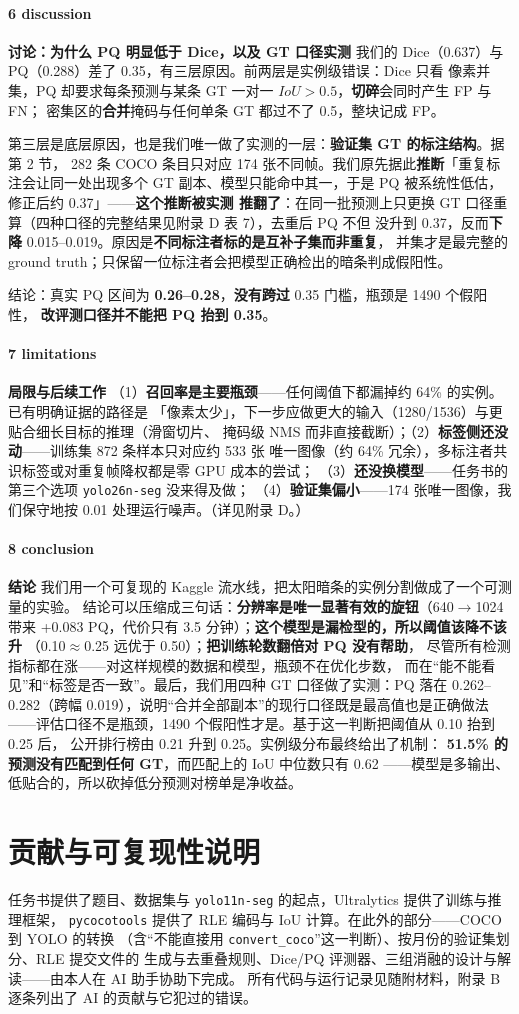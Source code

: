 \documentclass{article}
\begin{document}
\paragraph{6 discussion}
\textbf{讨论：为什么 PQ 明显低于 Dice，以及 GT 口径实测}
我们的 Dice（0.637）与 PQ（0.288）差了 0.35，有三层原因。前两层是实例级错误：Dice 只看
像素并集，PQ 却要求每条预测与某条 GT 一对一 $IoU>0.5$，\textbf{切碎}会同时产生 FP 与 FN；
密集区的\textbf{合并}掩码与任何单条 GT 都过不了 0.5，整块记成 FP。

第三层是底层原因，也是我们唯一做了实测的一层：\textbf{验证集 GT 的标注结构}。据第 2 节，
282 条 COCO 条目只对应 174 张不同帧。我们原先据此\textbf{推断}「重复标注会让同一处出现多个
GT 副本、模型只能命中其一，于是 PQ 被系统性低估，修正后约 0.37」——\textbf{这个推断被实测
推翻了}：在同一批预测上只更换 GT 口径重算（四种口径的完整结果见附录 D 表 7），去重后 PQ 不但
没升到 0.37，反而\textbf{下降} 0.015--0.019。原因是\textbf{不同标注者标的是互补子集而非重复}，
并集才是最完整的 ground truth；只保留一位标注者会把模型正确检出的暗条判成假阳性。

结论：真实 PQ 区间为 \textbf{0.26--0.28}，\textbf{没有跨过} 0.35 门槛，瓶颈是 1490 个假阳性，
\textbf{改评测口径并不能把 PQ 抬到 0.35}。

\paragraph{7 limitations}
\textbf{局限与后续工作}
（1）\textbf{召回率是主要瓶颈}——任何阈值下都漏掉约 64\% 的实例。已有明确证据的路径是
「像素太少」，下一步应做更大的输入（1280/1536）与更贴合细长目标的推理（滑窗切片、
掩码级 NMS 而非直接截断）；（2）\textbf{标签侧还没动}——训练集 872 条样本只对应约 533 张
唯一图像（约 64\% 冗余），多标注者共识标签或对重复帧降权都是零 GPU 成本的尝试；
（3）\textbf{还没换模型}——任务书的第三个选项 \texttt{yolo26n-seg} 没来得及做；
（4）\textbf{验证集偏小}——174 张唯一图像，我们保守地按 0.01 处理运行噪声。（详见附录 D。）

\paragraph{8 conclusion}
\textbf{结论}
我们用一个可复现的 Kaggle 流水线，把太阳暗条的实例分割做成了一个可测量的实验。
结论可以压缩成三句话：\textbf{分辨率是唯一显著有效的旋钮}（640$\to$1024 带来
+0.083 PQ，代价只有 3.5 分钟）；\textbf{这个模型是漏检型的，所以阈值该降不该升}
（0.10$\approx$0.25 远优于 0.50）；\textbf{把训练轮数翻倍对 PQ 没有帮助}，
尽管所有检测指标都在涨——对这样规模的数据和模型，瓶颈不在优化步数，
而在“能不能看见”和“标签是否一致”。最后，我们用四种 GT 口径做了实测：PQ 落在
0.262--0.282（跨幅 0.019），说明“合并全部副本”的现行口径既是最高值也是正确做法
——评估口径不是瓶颈，1490 个假阳性才是。基于这一判断把阈值从 0.10 抬到 0.25 后，
公开排行榜由 0.21 升到 0.25。实例级分布最终给出了机制：
\textbf{51.5\% 的预测没有匹配到任何 GT}，而匹配上的 IoU 中位数只有 0.62
——模型是多输出、低贴合的，所以砍掉低分预测对榜单是净收益。

\section*{贡献与可复现性说明}
任务书提供了题目、数据集与 \texttt{yolo11n-seg} 的起点，Ultralytics 提供了训练与推理框架，
\texttt{pycocotools} 提供了 RLE 编码与 IoU 计算。在此外的部分——COCO 到 YOLO 的转换
（含“不能直接用 \texttt{convert\_coco}”这一判断）、按月份的验证集划分、RLE 提交文件的
生成与去重叠规则、Dice/PQ 评测器、三组消融的设计与解读——由本人在 AI 助手协助下完成。
所有代码与运行记录见随附材料，附录 B 逐条列出了 AI 的贡献与它犯过的错误。
\end{document}

